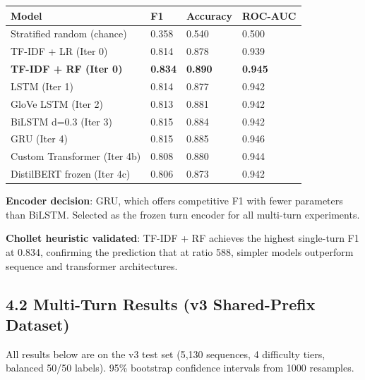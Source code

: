 \documentclass[
  11pt,
]{report}
\begin{document}
{\def\LTcaptype{} %
\begin{longtable}[]{@{}llll@{}}
\toprule\noalign{}
Model & F1 & Accuracy & ROC-AUC \\
\midrule\noalign{}
\endhead
\bottomrule\noalign{}
\endlastfoot
Stratified random (chance) & 0.358 & 0.540 & 0.500 \\
TF-IDF + LR (Iter 0) & 0.814 & 0.878 & 0.939 \\
\textbf{TF-IDF + RF (Iter 0)} & \textbf{0.834} & \textbf{0.890} &
\textbf{0.945} \\
LSTM (Iter 1) & 0.814 & 0.877 & 0.942 \\
GloVe LSTM (Iter 2) & 0.813 & 0.881 & 0.942 \\
BiLSTM d=0.3 (Iter 3) & 0.815 & 0.884 & 0.942 \\
GRU (Iter 4) & 0.815 & 0.885 & 0.946 \\
Custom Transformer (Iter 4b) & 0.808 & 0.880 & 0.944 \\
DistilBERT frozen (Iter 4c) & 0.806 & 0.873 & 0.942 \\
\end{longtable}
}

\textbf{Encoder decision}: GRU, which offers competitive F1 with fewer
parameters than BiLSTM. Selected as the frozen turn encoder for all
multi-turn experiments.

\textbf{Chollet heuristic validated}: TF-IDF + RF achieves the highest
single-turn F1 at 0.834, confirming the prediction that at ratio 588,
simpler models outperform sequence and transformer architectures.

\subsection{4.2 Multi-Turn Results (v3 Shared-Prefix
Dataset)}\label{multi-turn-results-v3-shared-prefix-dataset}

All results below are on the v3 test set (5,130 sequences, 4 difficulty
tiers, balanced 50/50 labels). 95\% bootstrap confidence intervals from
1000 resamples.
\end{document}
